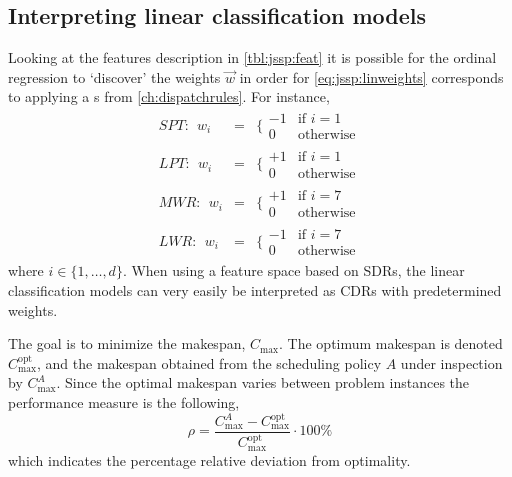 \documentclass[smallextended]{svjour3}
\begin{document}
\subsection{Interpreting linear classification 
	models}\label{sec:learningmodels:interpret}
Looking at the features description in \cref{tbl:jssp:feat} it is possible for 
the ordinal regression to `discover' the weights $\vec{w}$ in order for 
\cref{eq:jssp:linweights} corresponds to applying a \sdr s from 
\cref{ch:dispatchrules}. For instance, 
\begin{eqnarray*} %
	SPT:~~w_i&=&\bigg\{ \begin{array}{rl}-1&\text{if 
		}i=1\\0&\text{otherwise}\end{array} \\
	LPT:~~w_i&=&\bigg\{ \begin{array}{rl}+1&\text{if 
		}i=1\\0&\text{otherwise}\end{array} \\
	MWR:~~w_i&=&\bigg\{ \begin{array}{rl}+1&\text{if 
		}i=7\\0&\text{otherwise}\end{array} \\
	LWR:~~w_i&=&\bigg\{ \begin{array}{rl}-1&\text{if 
		}i=7\\0&\text{otherwise}\end{array}
\end{eqnarray*}
where $i\in\{1,\ldots,d\}$. %
When using a feature space based on SDRs, the linear classification models can 
very easily be interpreted as CDRs with predetermined weights.


The goal is to minimize the makespan, $C_{\max}$. The optimum 
makespan is denoted $C_{\max}^{\text{opt}}$, and the makespan obtained from the 
scheduling policy $A$ under inspection by $C_{\max}^{A}$. Since the optimal 
makespan varies between problem instances the performance measure is the 
following,
\begin{equation}\label{eq:ratio}
	\rho=\frac{C_{\max}^{A}-C_{\max}^{\text{opt}}}{C_{\max}^{\text{opt}}}\cdot
	100\%
\end{equation}
which indicates the percentage relative deviation from optimality. %
\end{document}
